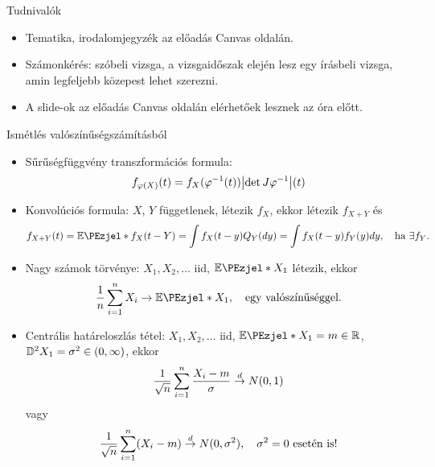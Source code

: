 \documentclass[aspectratio=169,notheorems,9pt,\option]{beamer}
\begin{document}
  \frame{\titlepage}

  \begin{frame}{Tudnivalók}
    \begin{itemize}[<*>]
      \item Tematika, irodalomjegyzék az előadás Canvas oldalán.
      \item Számonkérés: szóbeli vizsga, 
      a vizsgaidőszak elején lesz egy írásbeli vizsga, amin legfeljebb közepest lehet szerezni.
      \item A slide-ok az előadás Canvas oldalán elérhetőek lesznek az óra előtt.
    \end{itemize}
  \end{frame} 

\begin{frame}{Ismétlés valószínűségszámításból}

  \begin{itemize}
    \item Sűrűségfüggvény transzformációs formula:
    \begin{displaymath}
      f_{\phi(X)}(t)=f_X(\phi^{-1}(t))\abs*{\det J\phi^{-1}}(t)
    \end{displaymath}
    \item Konvolúciós formula: $X$, $Y$ függetlenek, létezik $f_X$, ekkor létezik $f_{X+Y}$ és 
    \begin{displaymath}
      f_{X+Y}(t)=\E{f_X(t-Y)}=\int f_X(t-y) Q_Y(dy)=\int f_X(t-y)f_Y(y)d y,\quad 
      \text{ha $\exists f_Y$}. %
    \end{displaymath}
    \item Nagy számok törvénye: $X_1,X_2,\dots$ iid, $\E{X_1}$ létezik, ekkor
    \begin{displaymath}
      \frac1n\sum_{i=1}^n X_i\to \E{X_1},\quad \text{egy valószínűséggel.}
    \end{displaymath}
    \item Centrális határeloszlás tétel: $X_1,X_2,\dots$ iid, 
    $\E{X_1}=m\in\real$,  $\D^2{X_1}=\sigma^2\in(0,\infty)$, 
    ekkor 
    \begin{displaymath}
      \frac1{\sqrt{n}}\sum_{i=1}^n \frac{X_i-m}{\sigma}\stackrel{d}{\to} N(0,1)
    \end{displaymath}
    vagy 
    \begin{displaymath}
      \frac1{\sqrt{n}}\sum_{i=1}^n (X_i-m)\stackrel{d}{\to} N(0,\sigma^2),\quad \text{$\sigma^2=0$ esetén is!}
    \end{displaymath}
  \end{itemize}
\end{frame}
\end{document}

